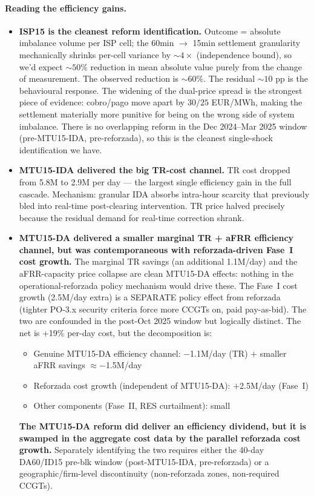 \documentclass[11pt,a4paper]{article}
\begin{document}
\paragraph{Reading the efficiency gains.}
\begin{itemize}
\item \textbf{ISP15 is the cleanest reform identification.} Outcome = absolute imbalance volume per ISP cell; the 60min $\to$ 15min settlement granularity mechanically shrinks per-cell variance by $\sim 4\times$ (independence bound), so we'd expect $\sim 50\%$ reduction in mean absolute value purely from the change of measurement. The observed reduction is $\sim 60\%$. The residual $\sim 10$ pp is the behavioural response. The widening of the dual-price spread is the strongest piece of evidence: cobro/pago move apart by $30/25$ EUR/MWh, making the settlement materially more punitive for being on the wrong side of system imbalance. There is no overlapping reform in the Dec 2024--Mar 2025 window (pre-MTU15-IDA, pre-reforzada), so this is the cleanest single-shock identification we have.

\item \textbf{MTU15-IDA delivered the big TR-cost channel.} TR cost dropped from \texteuro 5.8M to \texteuro 2.9M per day --- the largest single efficiency gain in the full cascade. Mechanism: granular IDA absorbs intra-hour scarcity that previously bled into real-time post-clearing intervention. TR price halved precisely because the residual demand for real-time correction shrank.

\item \textbf{MTU15-DA delivered a smaller marginal TR + aFRR efficiency channel, but was contemporaneous with reforzada-driven Fase~I cost growth.} The marginal TR savings (an additional \texteuro 1.1M/day) and the aFRR-capacity price collapse are clean MTU15-DA effects: nothing in the operational-reforzada policy mechanism would drive these. The Fase~I cost growth (\texteuro 2.5M/day extra) is a SEPARATE policy effect from reforzada (tighter PO-3.x security criteria force more CCGTs on, paid pay-as-bid). The two are confounded in the post-Oct 2025 window but logically distinct. The net is +19\% per-day cost, but the decomposition is:
   \begin{itemize}\setlength{\itemsep}{1pt}
   \item Genuine MTU15-DA efficiency channel: $-$\texteuro 1.1M/day (TR) $+$ smaller aFRR savings $\approx -$\texteuro 1.5M/day
   \item Reforzada cost growth (independent of MTU15-DA): $+$\texteuro 2.5M/day (Fase~I)
   \item Other components (Fase~II, RES curtailment): small
   \end{itemize}
   \textbf{The MTU15-DA reform did deliver an efficiency dividend, but it is swamped in the aggregate cost data by the parallel reforzada cost growth.} Separately identifying the two requires either the 40-day DA60/ID15 pre-blk window (post-MTU15-IDA, pre-reforzada) or a geographic/firm-level discontinuity (non-reforzada zones, non-required CCGTs).
\end{itemize}
\end{document}
